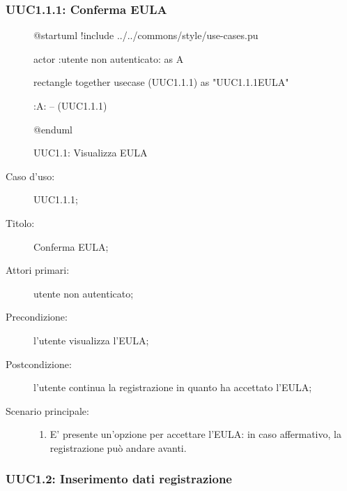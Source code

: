 \documentclass[components/casi-duso-app]{subfiles}
\begin{document}
\subsubsection{UUC1.1.1: Conferma EULA}%
\label{subs:UUC1.1.1}

\begin{figure}[H]
  \centering
  \begin{plantuml}
  @startuml
  !include ../../commons/style/use-cases.pu

  actor :utente non autenticato: as A

  rectangle {
    together {
      usecase (UUC1.1.1) as "UUC1.1.1\nConferma EULA"
    }
  }

  :A: -- (UUC1.1.1)

  @enduml
  \end{plantuml}
  \caption{UUC1.1: Visualizza EULA}%
  \label{fig:uuc1.1}
\end{figure}


\begin{description}
  \item[Caso d’uso:] UUC1.1.1;
  \item[Titolo:] Conferma EULA;
  \item[Attori primari:] utente non autenticato;
  \item[Precondizione:] l'utente visualizza l'EULA;
  \item[Postcondizione:] l'utente continua la registrazione in quanto ha accettato l'EULA;
  \item[Scenario principale:]
        \begin{enumerate}
          \item E' presente un'opzione per accettare l'EULA: in caso affermativo, la registrazione può andare avanti.
        \end{enumerate}
\end{description}



\subsubsection{UUC1.2: Inserimento dati registrazione}%
\label{subs:UUC1.2}
\end{document}
